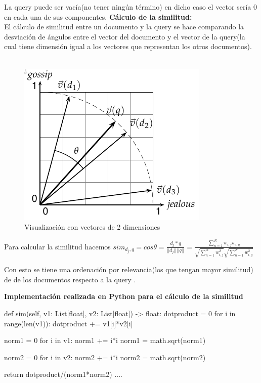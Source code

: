 \documentclass{llncs}
\begin{document}
La query puede ser vacía(no tener ningún término) en dicho caso el vector sería 0 en cada una de sus componentes.
\noindent
\textbf{Cálculo de la similitud:}\\
El cálculo de similitud entre un documento y la query se hace comparando la desviación de ángulos entre el vector del documento 
y el vector de la query(la cual tiene dimensión igual a los vectores que representan los otros documentos).
\\\\

\begin{figure}
    \caption{Visualización con vectores de 2 dimensiones}
    \includegraphics[scale = .5]{./images/ejemplosim.png}
\end{figure}

Para calcular la similitud hacemos
$
    sim_{d_j, q} = cos{\theta}=\frac{d_j*q}{||d_j||||q||} = \frac{\sum_{n = 1}^{N} w_{i,j}w_{i,q} }
    { \sqrt{\sum_{n = 1}^{N} w_{i,j}^{2} } \sqrt{\sum_{n = 1}^{N} w_{i,q}^{2} }}
$

Con esto se tiene una ordenación por relevancia(los que tengan mayor similitud) de 
de los documentos respecto a la query .

\textbf{Implementación realizada en Python para el cálculo de la similitud}

\begin{python}
    def sim(self, v1: List[float], v2: List[float]) -> float:
        dotproduct = 0
        for i in range(len(v1)):
            dotproduct += v1[i]*v2[i]

        norm1 = 0
        for i in v1:
            norm1 += i*i
        norm1 = math.sqrt(norm1)

        norm2 = 0
        for i in v2:
            norm2 += i*i
        norm2 = math.sqrt(norm2)

        return dotproduct/(norm1*norm2)
    ....
\end{python}
\end{document}
